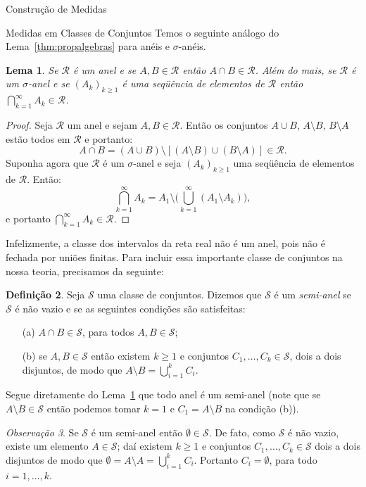 \documentclass[oneside,final,11pt]{amsbook}
\theoremstyle{remark}\newtheorem{exercise}{Exercício}[chapter]
\theoremstyle{remark}\newtheorem{*exercise}[exercise]{\hbox to 0pt{\hskip 0pt minus 1fil*}Exercício}
\theoremstyle{definition}\newtheorem{exdefin}{Definição}[chapter]
\theoremstyle{plain}\newtheorem{teo}{Teorema}[section]
\theoremstyle{plain}\newtheorem{lem}[teo]{Lema}
\theoremstyle{plain}\newtheorem{prop}[teo]{Proposição}
\theoremstyle{plain}\newtheorem{cor}[teo]{Corolário}
\theoremstyle{definition}\newtheorem{defin}[teo]{Definição}
\theoremstyle{remark}\newtheorem{rem}[teo]{Observação}
\theoremstyle{definition}\newtheorem{notation}[teo]{Notação}
\theoremstyle{definition}\newtheorem{convention}[teo]{Convenção}
\theoremstyle{definition}\newtheorem{example}[teo]{Exemplo}
\numberwithin{section}{chapter}
\numberwithin{equation}{section}
\begin{document}
\begin{chapter}{Construção de Medidas}
\begin{section}{Medidas em Classes de Conjuntos}
Temos o seguinte análogo do Lema~\ref{thm:propalgebras} para anéis e $\sigma$-anéis.
\begin{lem}\label{thm:propaneis}
Se $\mathcal R$ é um anel e se $A,B\in\mathcal R$ então $A\cap B\in\mathcal R$. Além do mais, se $\mathcal R$ é um
$\sigma$-anel e se $(A_k)_{k\ge1}$ é uma seqüência de elementos de $\mathcal R$
então $\bigcap_{k=1}^\infty A_k\in\mathcal R$.
\end{lem}
\begin{proof}
Seja $\mathcal R$ um anel e sejam $A,B\in\mathcal R$. Então os conjuntos $A\cup B$, $A\setminus B$, $B\setminus A$
estão todos em $\mathcal R$ e portanto:
\[A\cap B=(A\cup B)\setminus[(A\setminus B)\cup(B\setminus A)]\in\mathcal R.\]
Suponha agora que $\mathcal R$ é um $\sigma$-anel e seja $(A_k)_{k\ge1}$ uma seqüência de elementos de $\mathcal R$.
Então:
\[\bigcap_{k=1}^\infty A_k=A_1\setminus\Big(\bigcup_{k=1}^\infty(A_1\setminus A_k)\Big),\]
e portanto $\bigcap_{k=1}^\infty A_k\in\mathcal R$.
\end{proof}

Infelizmente, a classe dos intervalos da reta real não é um anel, pois não é fechada por uniões finitas. Para
incluir essa importante classe de conjuntos na nossa teoria, precisamos da seguinte:
\begin{defin}
Seja $\mathcal S$ uma classe de conjuntos. Dizemos que $\mathcal S$ é um {\em semi-anel\/}
se $\mathcal S$ é não vazio e se as seguintes condições são satisfeitas:
\begin{itemize}
\item[(a)] $A\cap B\in\mathcal S$, para todos $A,B\in\mathcal S$;
\item[(b)] se $A,B\in\mathcal S$ então existem $k\ge1$ e conjuntos $C_1,\ldots,C_k\in\mathcal S$, dois a dois disjuntos,
de modo que $A\setminus B=\bigcup_{i=1}^kC_i$.
\end{itemize}
\end{defin}
Segue diretamente do Lema~\ref{thm:propaneis} que todo anel é um semi-anel (note que se $A\setminus B\in\mathcal S$ então
podemos tomar $k=1$ e $C_1=A\setminus B$ na condição (b)).

\begin{rem}
Se $\mathcal S$ é um semi-anel então $\emptyset\in\mathcal S$. De fato, como $\mathcal S$ é não vazio, existe um elemento
$A\in\mathcal S$; daí existem $k\ge1$ e conjuntos $C_1,\ldots,C_k\in\mathcal S$ dois a dois disjuntos
de modo que $\emptyset=A\setminus A=\bigcup_{i=1}^kC_i$. Portanto $C_i=\emptyset$, para todo $i=1,\ldots,k$.
\end{rem}


\end{section}
\end{chapter}
\end{document}

